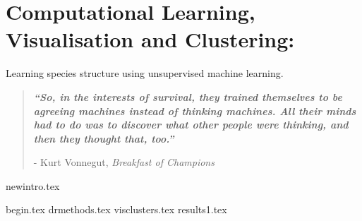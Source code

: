 

\chapter{ Computational Learning, Visualisation and Clustering:}
\vspace{-1cm} {\Large Learning species structure using unsupervised machine learning. } 


\blankpage
\restoregeometry
\vspace*{0.15\paperheight}


\begin{center}
\begin{quotation}
  \large{\emph{\textbf{``So, in the interests of survival, they trained themselves to be agreeing machines instead of thinking machines. All their minds had to do was to discover what other people were thinking, and then they thought that, too.''} }  }  \\
  \begin{flushright}
  - Kurt Vonnegut, \textit{Breakfast of Champions} 
  \end{flushright}
 \end{quotation}
\end{center}
\doublespacing
\newpage

%
{newintro.tex}

{begin.tex}
{drmethods.tex}
{visclusters.tex}
{results1.tex}




\chapterbib







